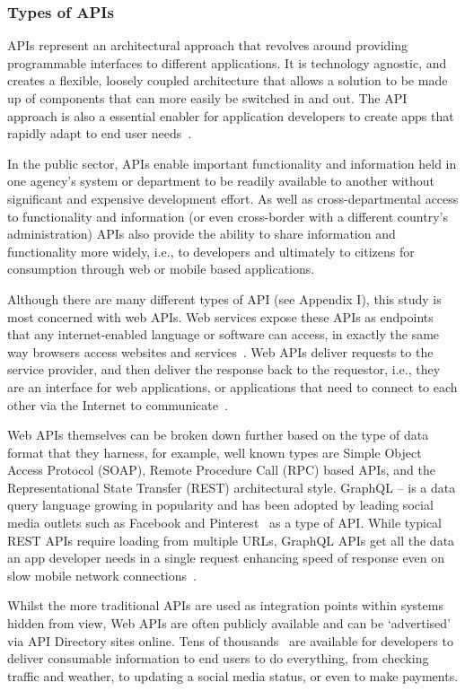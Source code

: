 \subsubsection{Types of APIs}

APIs represent an architectural approach that revolves around providing
programmable interfaces to different applications. It is technology agnostic,
and creates a flexible, loosely coupled architecture that allows a solution to be
made up of components that can more easily be switched in and out. The API approach
is also a essential enabler for application developers to create apps that rapidly adapt
to end user needs~\citep{hcl_tech}. 

In the public sector, APIs enable important functionality and information held in
one agency’s system or department to be readily available to another without
significant and expensive development effort. As well as cross-departmental
access to functionality and information (or even cross-border with a
different country’s administration) APIs also provide the ability to share
information and functionality more widely, i.e., to developers and ultimately
to citizens for consumption through web or mobile based applications.

Although there are many different types of API (see Appendix I), this study is
most concerned with web APIs. Web services expose these APIs as endpoints that
any internet-enabled language or software can access, in exactly the same way
browsers access websites and services~\citep{fed_tech}. Web APIs deliver requests to the
service provider, and then deliver the response back to the requestor,
i.e., they are an interface for web applications, or applications that need to
connect to each other via the Internet to communicate~\citep{define_api}.

Web APIs themselves can be broken down further based on the type of data format
that they harness, for example, well known types are Simple Object Access Protocol
(SOAP), Remote Procedure Call (RPC) based APIs, and the Representational State
Transfer (REST) architectural style. GraphQL – is a data query language growing
in popularity and has been adopted by leading social media outlets such as Facebook
and Pinterest~\citep{graphql} as a type of API. While typical REST APIs require loading
from multiple URLs, GraphQL APIs get all the data an app developer needs in a single
request enhancing speed of response even on slow mobile network connections~\citep{graphql}.

Whilst the more traditional APIs are used as integration points within systems
hidden from view, Web APIs are often publicly available and can be ‘advertised’
via API Directory sites online. Tens of thousands~\citep{programmableweb_search} are available for developers
to deliver consumable information to end users to do everything, from checking
traffic and weather, to updating a social media status, or even to make payments.

